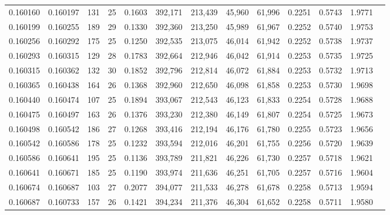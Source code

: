 \begin{tabular}{rrrrrrrrrrrrr}
0.160160 & 0.160197 & 131 &  25 &                                     0.1603 & 392,171 & 213,439 &  45,960 &  61,996 & 0.2251 & 0.5743 & 1.9771 \\
0.160199 & 0.160255 & 189 &  29 &                                     0.1330 & 392,360 & 213,250 &  45,989 &  61,967 & 0.2252 & 0.5740 & 1.9753 \\
0.160256 & 0.160292 & 175 &  25 &                                     0.1250 & 392,535 & 213,075 &  46,014 &  61,942 & 0.2252 & 0.5738 & 1.9737 \\
0.160293 & 0.160315 & 129 &  28 &                                     0.1783 & 392,664 & 212,946 &  46,042 &  61,914 & 0.2253 & 0.5735 & 1.9725 \\
0.160315 & 0.160362 & 132 &  30 &                                     0.1852 & 392,796 & 212,814 &  46,072 &  61,884 & 0.2253 & 0.5732 & 1.9713 \\
0.160365 & 0.160438 & 164 &  26 &                                     0.1368 & 392,960 & 212,650 &  46,098 &  61,858 & 0.2253 & 0.5730 & 1.9698 \\
0.160440 & 0.160474 & 107 &  25 &                                     0.1894 & 393,067 & 212,543 &  46,123 &  61,833 & 0.2254 & 0.5728 & 1.9688 \\
0.160475 & 0.160497 & 163 &  26 &                                     0.1376 & 393,230 & 212,380 &  46,149 &  61,807 & 0.2254 & 0.5725 & 1.9673 \\
0.160498 & 0.160542 & 186 &  27 &                                     0.1268 & 393,416 & 212,194 &  46,176 &  61,780 & 0.2255 & 0.5723 & 1.9656 \\
0.160542 & 0.160586 & 178 &  25 &                                     0.1232 & 393,594 & 212,016 &  46,201 &  61,755 & 0.2256 & 0.5720 & 1.9639 \\
0.160586 & 0.160641 & 195 &  25 &                                     0.1136 & 393,789 & 211,821 &  46,226 &  61,730 & 0.2257 & 0.5718 & 1.9621 \\
0.160641 & 0.160671 & 185 &  25 &                                     0.1190 & 393,974 & 211,636 &  46,251 &  61,705 & 0.2257 & 0.5716 & 1.9604 \\
0.160674 & 0.160687 & 103 &  27 &                                     0.2077 & 394,077 & 211,533 &  46,278 &  61,678 & 0.2258 & 0.5713 & 1.9594 \\
0.160687 & 0.160733 & 157 &  26 &                                     0.1421 & 394,234 & 211,376 &  46,304 &  61,652 & 0.2258 & 0.5711 & 1.9580 \\

\end{tabular}
